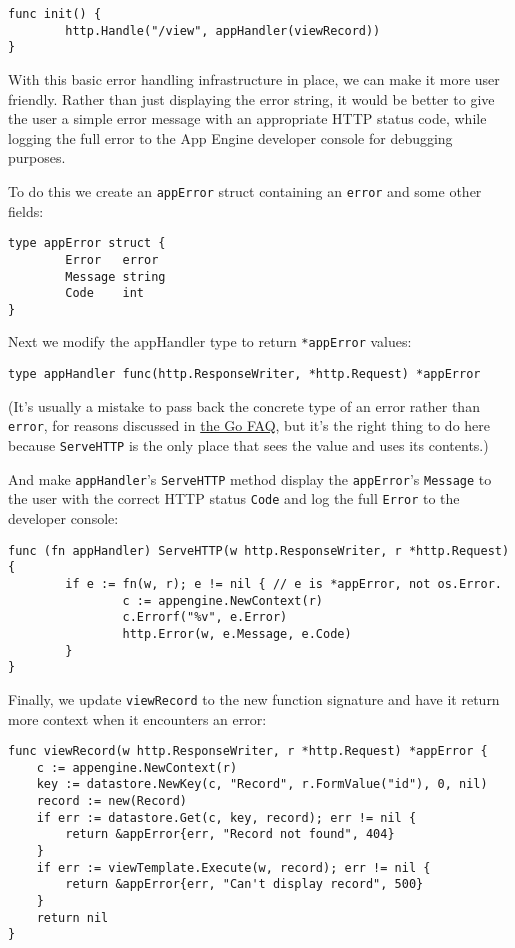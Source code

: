\begin{Verbatim}[frame=single]
func init() {
        http.Handle("/view", appHandler(viewRecord))
}
\end{Verbatim}

With this basic error handling infrastructure in place, we can make it
more user friendly. Rather than just displaying the error string, it
would be better to give the user a simple error message with an
appropriate HTTP status code, while logging the full error to the App
Engine developer console for debugging purposes.

To do this we create an \texttt{appError} struct containing an
\texttt{error} and some other fields:

\begin{Verbatim}[frame=single]
type appError struct {
        Error   error
        Message string
        Code    int
}
\end{Verbatim}

Next we modify the appHandler type to return \texttt{*appError} values:

\begin{Verbatim}[frame=single]
type appHandler func(http.ResponseWriter, *http.Request) *appError
\end{Verbatim}

(It's usually a mistake to pass back the concrete type of an error
rather than \texttt{error}, for reasons discussed in
\href{http://golang.org/doc/go\_faq.html\#nil\_error}{the Go FAQ}, but it's the right
thing to do here because \texttt{ServeHTTP} is the only place that sees
the value and uses its contents.)

And make \texttt{appHandler}'s \texttt{ServeHTTP} method display the
\texttt{appError}'s \texttt{Message} to the user with the correct HTTP
status \texttt{Code} and log the full \texttt{Error} to the developer
console:

\begin{Verbatim}[frame=single]
func (fn appHandler) ServeHTTP(w http.ResponseWriter, r *http.Request) {
        if e := fn(w, r); e != nil { // e is *appError, not os.Error.
                c := appengine.NewContext(r)
                c.Errorf("%v", e.Error)
                http.Error(w, e.Message, e.Code)
        }
}
\end{Verbatim}

Finally, we update \texttt{viewRecord} to the new function signature and
have it return more context when it encounters an error:

\begin{Verbatim}[frame=single]
func viewRecord(w http.ResponseWriter, r *http.Request) *appError {
    c := appengine.NewContext(r)
    key := datastore.NewKey(c, "Record", r.FormValue("id"), 0, nil)
    record := new(Record)
    if err := datastore.Get(c, key, record); err != nil {
        return &appError{err, "Record not found", 404}
    }
    if err := viewTemplate.Execute(w, record); err != nil {
        return &appError{err, "Can't display record", 500}
    }
    return nil
}
\end{Verbatim}

